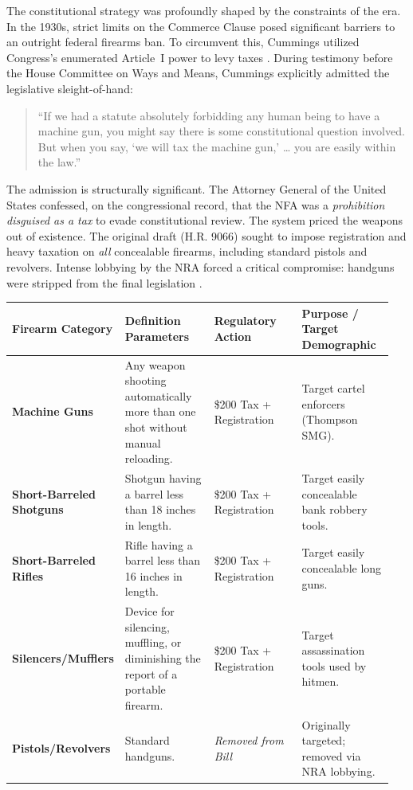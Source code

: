 The constitutional strategy was profoundly shaped by the constraints of the era. In the 1930s, strict limits on the Commerce Clause posed significant barriers to an outright federal firearms ban. To circumvent this, Cummings utilized Congress's enumerated Article~I power to levy taxes \cite{cornell_nfa, fulbright_nfa}. During testimony before the House Committee on Ways and Means, Cummings explicitly admitted the legislative sleight-of-hand:

\begin{quote}
``If we had a statute absolutely forbidding any human being to have a machine gun, you might say there is some constitutional question involved. But when you say, `we will tax the machine gun,' \ldots{} you are easily within the law.'' \cite{cornell_nfa}
\end{quote}

The admission is structurally significant. The Attorney General of the United States confessed, on the congressional record, that the NFA was a \textit{prohibition disguised as a tax} to evade constitutional review. The system priced the weapons out of existence. The original draft (H.R. 9066) sought to impose registration and heavy taxation on \textit{all} concealable firearms, including standard pistols and revolvers. Intense lobbying by the NRA forced a critical compromise: handguns were stripped from the final legislation \cite{recoil_nfa, ebsco_nfa}.

{\def\LTcaptype{none}
\begin{longtable}[]{@{}
  >{\raggedright\arraybackslash}p{0.20\linewidth}
  >{\raggedright\arraybackslash}p{0.25\linewidth}
  >{\raggedright\arraybackslash}p{0.25\linewidth}
  >{\raggedright\arraybackslash}p{0.25\linewidth}@{}}
\toprule
Firearm Category & Definition Parameters & Regulatory Action & Purpose / Target Demographic \\
\midrule
\endhead
\bottomrule
\endlastfoot
\textbf{Machine Guns} & Any weapon shooting automatically more than one shot without manual reloading. & \$200 Tax + Registration & Target cartel enforcers (Thompson SMG). \\
\textbf{Short-Barreled Shotguns} & Shotgun having a barrel less than 18 inches in length. & \$200 Tax + Registration & Target easily concealable bank robbery tools. \\
\textbf{Short-Barreled Rifles} & Rifle having a barrel less than 16 inches in length. & \$200 Tax + Registration & Target easily concealable long guns. \\
\textbf{Silencers/Mufflers} & Device for silencing, muffling, or diminishing the report of a portable firearm. & \$200 Tax + Registration & Target assassination tools used by hitmen. \\
\textbf{Pistols/Revolvers} & Standard handguns. & \emph{Removed from Bill} & Originally targeted; removed via NRA lobbying. \\
\end{longtable}
}

